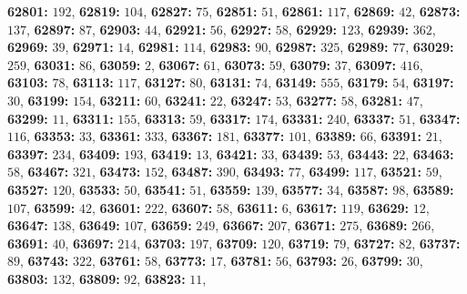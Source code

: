 \textsf{\bfseries 62801:} $192$, \textsf{\bfseries 62819:} $104$, \textsf{\bfseries 62827:} $75$, \textsf{\bfseries 62851:} $51$, \textsf{\bfseries 62861:} $117$, \textsf{\bfseries 62869:} $42$, \textsf{\bfseries 62873:} $137$, \textsf{\bfseries 62897:} $87$, \textsf{\bfseries 62903:} $44$, \textsf{\bfseries 62921:} $56$, \textsf{\bfseries 62927:} $58$, \textsf{\bfseries 62929:} $123$, \textsf{\bfseries 62939:} $362$, \textsf{\bfseries 62969:} $39$, \textsf{\bfseries 62971:} $14$, \textsf{\bfseries 62981:} $114$, \textsf{\bfseries 62983:} $90$, \textsf{\bfseries 62987:} $325$, \textsf{\bfseries 62989:} $77$, \textsf{\bfseries 63029:} $259$, \textsf{\bfseries 63031:} $86$, \textsf{\bfseries 63059:} $2$, \textsf{\bfseries 63067:} $61$, \textsf{\bfseries 63073:} $59$, \textsf{\bfseries 63079:} $37$, \textsf{\bfseries 63097:} $416$, \textsf{\bfseries 63103:} $78$, \textsf{\bfseries 63113:} $117$, \textsf{\bfseries 63127:} $80$, \textsf{\bfseries 63131:} $74$, \textsf{\bfseries 63149:} $555$, \textsf{\bfseries 63179:} $54$, \textsf{\bfseries 63197:} $30$, \textsf{\bfseries 63199:} $154$, \textsf{\bfseries 63211:} $60$, \textsf{\bfseries 63241:} $22$, \textsf{\bfseries 63247:} $53$, \textsf{\bfseries 63277:} $58$, \textsf{\bfseries 63281:} $47$, \textsf{\bfseries 63299:} $11$, \textsf{\bfseries 63311:} $155$, \textsf{\bfseries 63313:} $59$, \textsf{\bfseries 63317:} $174$, \textsf{\bfseries 63331:} $240$, \textsf{\bfseries 63337:} $51$, \textsf{\bfseries 63347:} $116$, \textsf{\bfseries 63353:} $33$, \textsf{\bfseries 63361:} $333$, \textsf{\bfseries 63367:} $181$, \textsf{\bfseries 63377:} $101$, \textsf{\bfseries 63389:} $66$, \textsf{\bfseries 63391:} $21$, \textsf{\bfseries 63397:} $234$, \textsf{\bfseries 63409:} $193$, \textsf{\bfseries 63419:} $13$, \textsf{\bfseries 63421:} $33$, \textsf{\bfseries 63439:} $53$, \textsf{\bfseries 63443:} $22$, \textsf{\bfseries 63463:} $58$, \textsf{\bfseries 63467:} $321$, \textsf{\bfseries 63473:} $152$, \textsf{\bfseries 63487:} $390$, \textsf{\bfseries 63493:} $77$, \textsf{\bfseries 63499:} $117$, \textsf{\bfseries 63521:} $59$, \textsf{\bfseries 63527:} $120$, \textsf{\bfseries 63533:} $50$, \textsf{\bfseries 63541:} $51$, \textsf{\bfseries 63559:} $139$, \textsf{\bfseries 63577:} $34$, \textsf{\bfseries 63587:} $98$, \textsf{\bfseries 63589:} $107$, \textsf{\bfseries 63599:} $42$, \textsf{\bfseries 63601:} $222$, \textsf{\bfseries 63607:} $58$, \textsf{\bfseries 63611:} $6$, \textsf{\bfseries 63617:} $119$, \textsf{\bfseries 63629:} $12$, \textsf{\bfseries 63647:} $138$, \textsf{\bfseries 63649:} $107$, \textsf{\bfseries 63659:} $249$, \textsf{\bfseries 63667:} $207$, \textsf{\bfseries 63671:} $275$, \textsf{\bfseries 63689:} $266$, \textsf{\bfseries 63691:} $40$, \textsf{\bfseries 63697:} $214$, \textsf{\bfseries 63703:} $197$, \textsf{\bfseries 63709:} $120$, \textsf{\bfseries 63719:} $79$, \textsf{\bfseries 63727:} $82$, \textsf{\bfseries 63737:} $89$, \textsf{\bfseries 63743:} $322$, \textsf{\bfseries 63761:} $58$, \textsf{\bfseries 63773:} $17$, \textsf{\bfseries 63781:} $56$, \textsf{\bfseries 63793:} $26$, \textsf{\bfseries 63799:} $30$, \textsf{\bfseries 63803:} $132$, \textsf{\bfseries 63809:} $92$, \textsf{\bfseries 63823:} $11$, 

